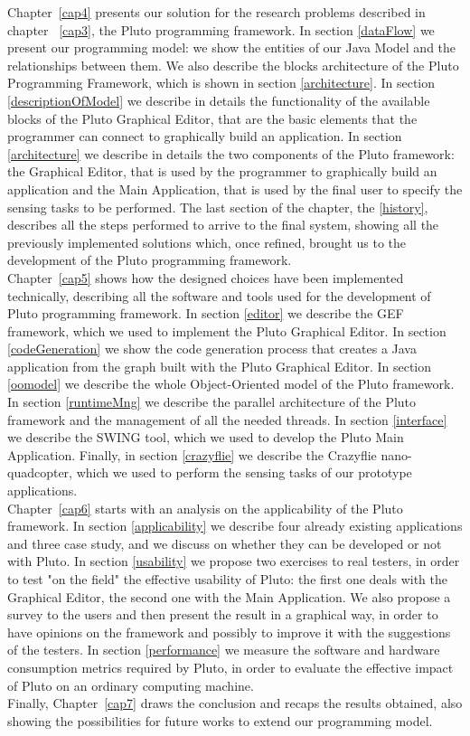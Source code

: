 Chapter~\ref{cap4} presents our solution for the research problems described in chapter ~\ref{cap3}, the Pluto programming framework.
In section \ref{dataFlow} we present our programming model:
we show the entities of our Java Model and the relationships between them.
We also describe the blocks architecture of the Pluto Programming Framework, which is shown in section \ref{architecture}.
In section \ref{descriptionOfModel} we describe in details the functionality of the available blocks of the Pluto Graphical Editor, that are the basic elements that the programmer can connect to graphically build an application.
In section \ref{architecture} we describe in details the two components of the Pluto framework:
the Graphical Editor, that is used by the programmer to graphically build an application and the Main Application, that is used by the final user to specify the sensing tasks to be performed.
The last section of the chapter, the \ref{history}, describes all the steps performed to arrive to the final system, showing all the previously implemented solutions which, once refined, brought us to the development of the Pluto programming framework.
\\

Chapter~\ref{cap5} shows how the designed choices have been implemented technically, describing all the software and tools used for the development of Pluto programming framework.
In section \ref{editor} we describe the GEF framework, which we used to implement the Pluto Graphical Editor.
In section \ref{codeGeneration} we show the code generation process that creates a Java application from the graph built with the Pluto Graphical Editor.
In section \ref{oomodel} we describe the whole Object-Oriented model of the Pluto framework.
In section \ref{runtimeMng} we describe the parallel architecture of the Pluto framework and the management of all the needed threads.
In section \ref{interface} we describe the SWING tool, which we used to develop the Pluto Main Application.
Finally, in section \ref{crazyflie} we describe the Crazyflie nano-quadcopter, which we used to perform the sensing tasks of our prototype applications.
\\

Chapter~\ref{cap6} starts with an analysis on the applicability of the Pluto framework.
In section \ref{applicability} we describe four already existing applications and three case study, and we discuss on whether they can be developed or not with Pluto. 
In section \ref{usability} we propose two exercises to real testers, in order to test "on the field" the effective usability of Pluto:
the first one deals with the Graphical Editor, the second one with the Main Application.
We also propose a survey to the users and then present the result in a graphical way, in order to have opinions on the framework and possibly to improve it with the suggestions of the testers.
In section \ref{performance} we measure the software and hardware consumption metrics required by Pluto, in order to evaluate the effective impact of Pluto on an ordinary computing machine.
\\

Finally, Chapter~\ref{cap7} draws the conclusion and recaps the results obtained, also showing the possibilities for future works to extend our programming model.